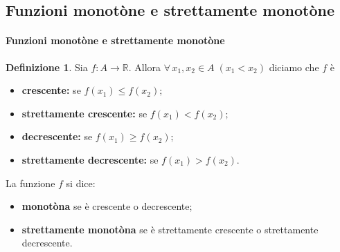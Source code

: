 \documentclass{article}
\theoremstyle{plain}
\theoremstyle{definition}
\newtheorem{defn}{Definizione}[section]
\theoremstyle{remark}
\begin{document}
\vspace{10pt}

\subsection{Funzioni monotòne e strettamente monotòne}

\vspace{10pt}

\paragraph{Funzioni monotòne e strettamente monotòne}
\begin{bxthm}
\begin{defn}
    Sia $f:A\to\mathbb{R}$. Allora $\forall\,x_1,x_2\in A\;(x_1<x_2)$ diciamo che $f$ è 
    \begin{itemize}
        \item \textbf{crescente: } se \(f(x_1)\leq f(x_2);\)
        \item \textbf{strettamente crescente: } se \(f(x_1)< f(x_2);\)
        \item \textbf{decrescente: } se \(f(x_1)\geq f(x_2);\)
        \item \textbf{strettamente decrescente: } se \(f(x_1)> f(x_2).\)
    \end{itemize}
    La funzione $f$ si dice:
    \begin{itemize}
        \item \textbf{monotòna} se è crescente o decrescente;
        \item \textbf{strettamente monotòna} se è strettamente crescente o strettamente decrescente.
    \end{itemize}
\end{defn}
\end{bxthm}

\vspace{10pt}
\end{document}
